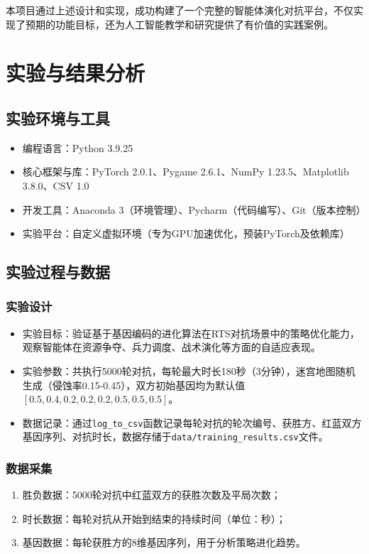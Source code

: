 \documentclass[12pt,a4paper]{article}
\begin{document}
	本项目通过上述设计和实现，成功构建了一个完整的智能体演化对抗平台，不仅实现了预期的功能目标，还为人工智能教学和研究提供了有价值的实践案例。
	
	\section{实验与结果分析}
	\subsection{实验环境与工具}
	\begin{itemize}
		\item 编程语言：Python 3.9.25
		\item 核心框架与库：PyTorch 2.0.1、Pygame 2.6.1、NumPy 1.23.5、Matplotlib 3.8.0、CSV 1.0
		\item 开发工具：Anaconda 3（环境管理）、Pycharm（代码编写）、Git（版本控制）
		\item 实验平台：自定义虚拟环境（专为GPU加速优化，预装PyTorch及依赖库）
	\end{itemize}
	\subsection{实验过程与数据}
	\subsubsection{实验设计}
	\begin{itemize}
		\item 实验目标：验证基于基因编码的进化算法在RTS对抗场景中的策略优化能力，观察智能体在资源争夺、兵力调度、战术演化等方面的自适应表现。
		\item 实验参数：共执行5000轮对抗，每轮最大时长180秒（3分钟），迷宫地图随机生成（侵蚀率0.15-0.45），双方初始基因均为默认值$[0.5, 0.4, 0.2, 0.2, 0.2, 0.5, 0.5, 0.5]$。
		\item 数据记录：通过\texttt{log\_to\_csv}函数记录每轮对抗的轮次编号、获胜方、红蓝双方基因序列、对抗时长，数据存储于\texttt{data/training\_results.csv}文件。
	\end{itemize}
	\subsubsection{数据采集}
	\begin{enumerate}
		\item 胜负数据：5000轮对抗中红蓝双方的获胜次数及平局次数；
		\item 时长数据：每轮对抗从开始到结束的持续时间（单位：秒）；
		\item 基因数据：每轮获胜方的8维基因序列，用于分析策略进化趋势。
	\end{enumerate}
	
\end{document}

